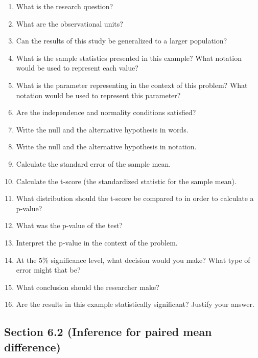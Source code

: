 \documentclass[
]{report}
\newcommand{\rgs}{\vspace{12pt}} %
\begin{document}
\begin{enumerate}
\def\labelenumi{\arabic{enumi}.}
\item
  What is the research question?
  \rgs
\item
  What are the observational units?
  \rgs
\item
  Can the results of this study be generalized to a larger population?
  \rgs
\item
  What is the sample statistics presented in this example? What notation would be used to represent each value?
  \rgs
\item
  What is the parameter representing in the context of this problem? What notation would be used to represent this parameter?
  \rgs
  \rgs
\item
  Are the independence and normality conditions satisfied?
  \rgs
  \rgs
\item
  Write the null and the alternative hypothesis in words.
  \rgs
  \rgs
\item
  Write the null and the alternative hypothesis in notation.
  \rgs
\item
  Calculate the standard error of the sample mean.
  \rgs
\item
  Calculate the t-score (the standardized statistic for the sample mean).
  \rgs
\item
  What distribution should the t-score be compared to in order to calculate a p-value?
  \rgs
\item
  What was the p-value of the test?
  \rgs
\item
  Interpret the p-value in the context of the problem.
  \rgs
  \rgs
\item
  At the 5\% significance level, what decision would you make? What type of error might that be?
  \rgs
\item
  What conclusion should the researcher make?
  \rgs
\item
  Are the results in this example statistically significant? Justify your answer.
  \rgs
\end{enumerate}

\hypertarget{section-6.2-inference-for-paired-mean-difference}{%
\subsection*{Section 6.2 (Inference for paired mean difference)}\label{section-6.2-inference-for-paired-mean-difference}}
\end{document}
